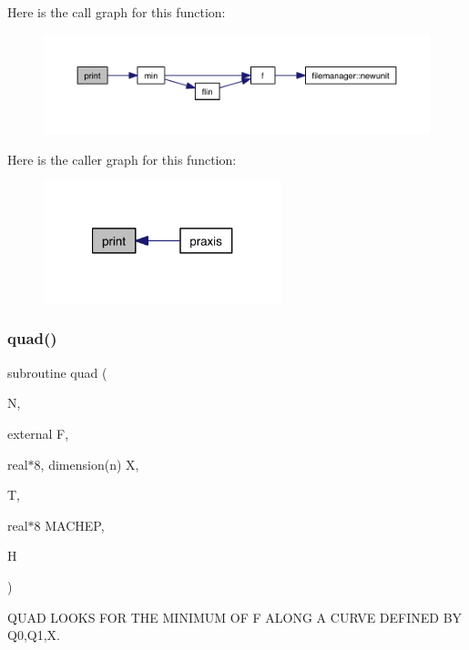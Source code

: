 Here is the call graph for this function\+:\nopagebreak
\begin{figure}[H]
\begin{center}
\leavevmode
\includegraphics[width=350pt]{praxis_8f_ac10ca39b9214d2a1ff4701ab237bf2a9_cgraph}
\end{center}
\end{figure}
Here is the caller graph for this function\+:\nopagebreak
\begin{figure}[H]
\begin{center}
\leavevmode
\includegraphics[width=196pt]{praxis_8f_ac10ca39b9214d2a1ff4701ab237bf2a9_icgraph}
\end{center}
\end{figure}
\mbox{\label{praxis_8f_a0527d011f50eb026ac3ceea522e0ca5a}} 
\subsubsection{\texorpdfstring{quad()}{quad()}}
{\footnotesize\ttfamily subroutine quad (\begin{DoxyParamCaption}\item[{}]{N,  }\item[{external}]{F,  }\item[{real$\ast$8, dimension(n)}]{X,  }\item[{}]{T,  }\item[{real$\ast$8}]{M\+A\+C\+H\+EP,  }\item[{}]{H }\end{DoxyParamCaption})}



Q\+U\+AD L\+O\+O\+KS F\+OR T\+HE M\+I\+N\+I\+M\+UM OF F A\+L\+O\+NG A C\+U\+R\+VE D\+E\+F\+I\+N\+ED BY Q0,Q1,X. 


